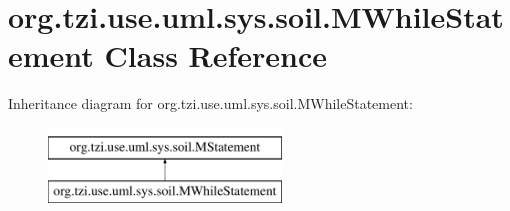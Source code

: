 \hypertarget{classorg_1_1tzi_1_1use_1_1uml_1_1sys_1_1soil_1_1_m_while_statement}{\section{org.\-tzi.\-use.\-uml.\-sys.\-soil.\-M\-While\-Statement Class Reference}
\label{classorg_1_1tzi_1_1use_1_1uml_1_1sys_1_1soil_1_1_m_while_statement}
}
Inheritance diagram for org.\-tzi.\-use.\-uml.\-sys.\-soil.\-M\-While\-Statement\-:\begin{figure}[H]
\begin{center}
\leavevmode
\includegraphics[height=2.000000cm]{classorg_1_1tzi_1_1use_1_1uml_1_1sys_1_1soil_1_1_m_while_statement}
\end{center}
\end{figure}
